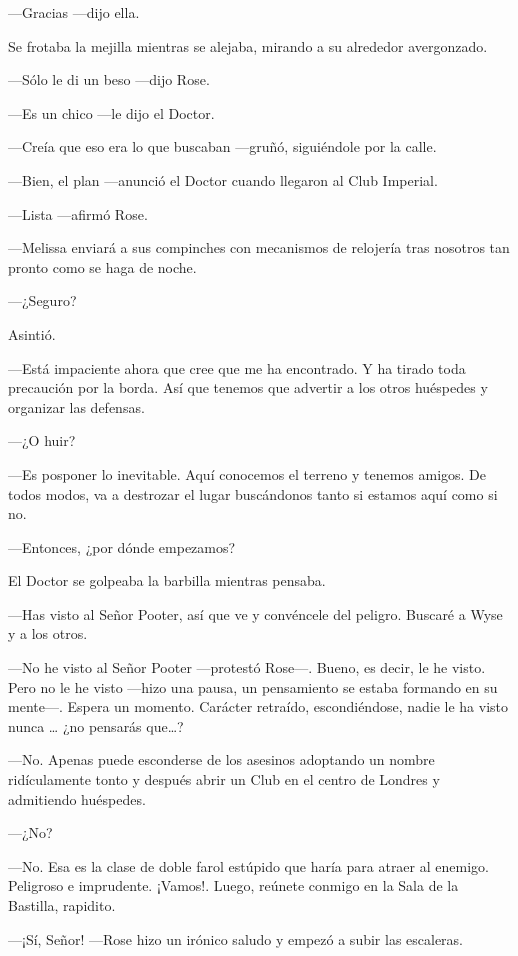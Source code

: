 {---Gracias ---dijo ella.}

{Se frotaba la mejilla mientras se alejaba, mirando a su alrededor
avergonzado.}

{---Sólo le di un beso ---dijo Rose.}

{---Es un chico ---le dijo el Doctor.}

{---Creía que eso era lo que buscaban ---gruñó, siguiéndole por la
calle.}

{---Bien, el plan ---anunció el Doctor cuando llegaron al Club
Imperial.}

{---Lista ---afirmó Rose.}

{---Melissa enviará a sus compinches con mecanismos de relojería tras
nosotros tan pronto como se haga de noche.}

{---¿Seguro?}

{Asintió.}

{---Está impaciente ahora que cree que me ha encontrado. Y ha tirado
	toda precaución por la borda. Así que tenemos que advertir a los otros
huéspedes y organizar las defensas.}

{---¿O huir?}

{---Es posponer lo inevitable. Aquí conocemos el terreno y tenemos
	amigos. De todos modos, va a destrozar el lugar buscándonos tanto si
estamos aquí como si no.}

{---Entonces, ¿por dónde empezamos?}

{El Doctor se golpeaba la barbilla mientras pensaba.}

{---Has visto al Señor Pooter, así que ve y convéncele del peligro.
Buscaré a Wyse y a los otros.}

{---No he visto al Señor Pooter ---protestó Rose---. Bueno, es decir, le
	he visto. Pero no le he visto ---hizo una pausa, un pensamiento se
	estaba formando en su mente---. Espera un momento. Carácter retraído,
	escondiéndose, nadie le ha visto nunca \ldots{} ¿no pensarás
	que\ldots{}?}

{---No. Apenas puede esconderse de los asesinos adoptando un nombre
	ridículamente tonto y después abrir un Club en el centro de Londres y
admitiendo huéspedes.}

{---¿No?}

{---No. Esa es la clase de doble farol estúpido que haría para atraer al
	enemigo. Peligroso e imprudente. ¡Vamos!. Luego, reúnete conmigo en la
Sala de la Bastilla, rapidito.}

{---¡Sí, Señor! ---Rose hizo un irónico saludo y empezó a subir las
escaleras.}

